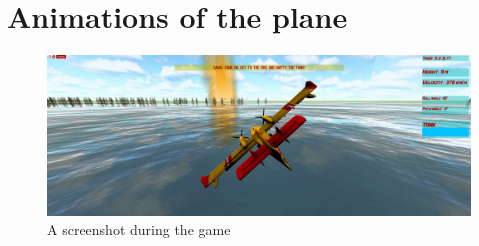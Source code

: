 \documentclass{article}
\begin{document}
\newpage
\section*{Animations of the plane}

\begin{figure}[h!]
  \includegraphics[width=\linewidth]{ImmaginiReport/schermata.png}
  \caption{A screenshot during the game}
\end{figure}
\end{document}
